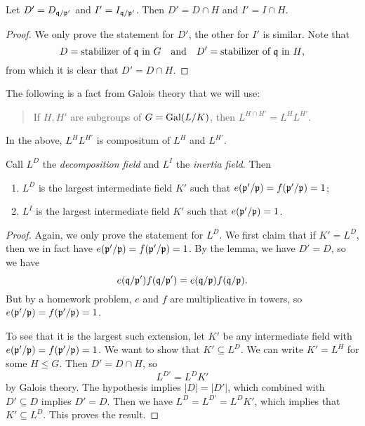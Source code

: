\begin{lemma}
  Let $D' = D_{\mathfrak{q} / \mathfrak{p}'}$ and
  $I' = I_{\mathfrak{q} / \mathfrak{p}'}$.
  Then $D' = D \cap H$ and $I' = I \cap H$.
\end{lemma}

\begin{proof}
  We only prove the statement for $D'$, the other for
  $I'$ is similar. Note that
  \[
    D = \text{stabilizer of $\mathfrak{q}$ in $G$} \quad \text{and} \quad
    D' = \text{stabilizer of $\mathfrak{q}$ in $H$},
  \]
  from which it is clear that $D' = D \cap H$.
\end{proof}

\begin{remark}
  The following is a fact from Galois theory that
  we will use:
  \begin{quote}
    If $H, H'$ are subgroups of $G = \operatorname{Gal}(L / K)$,
    then $L^{H \cap H'} = L^H L^{H'}$.
  \end{quote}
  In the above, $L^H L^{H'}$ is compositum of
  $L^H$ and $L^{H'}$.
\end{remark}

\begin{prop}
  Call $L^D$ the \emph{decomposition field} and
  $L^I$ the \emph{inertia field}. Then
  \begin{enumerate}
    \item $L^D$ is the largest intermediate field $K'$
      such that $e(\mathfrak{p}' / \mathfrak{p}) = f(\mathfrak{p}' / \mathfrak{p}) = 1$;
    \item $L^I$ is the largest intermediate field $K'$
      such that $e(\mathfrak{p}' / \mathfrak{p}) = 1$.
  \end{enumerate}
\end{prop}

\begin{proof}
  Again, we only prove the statement for $L^D$.
  We first claim that if $K' = L^D$, then we in fact
  have
  $e(\mathfrak{p}' / \mathfrak{p}) = f(\mathfrak{p}' / \mathfrak{p}) = 1$. By the lemma,
  we have $D' = D$, so we have
  \[
    e(\mathfrak{q} / \mathfrak{p}') f(\mathfrak{q} / \mathfrak{p}')
    = e(\mathfrak{q} / \mathfrak{p}) f(\mathfrak{q} / \mathfrak{p}).
  \]
  But by a homework problem, $e$ and $f$ are
  multiplicative in towers, so
  $e(\mathfrak{p}' / \mathfrak{p}) = f(\mathfrak{p}' / \mathfrak{p}) = 1$.

  To see that it is the largest such extension, let
  $K'$ be any intermediate field with
  $e(\mathfrak{p}' / \mathfrak{p}) = f(\mathfrak{p}' / \mathfrak{p}) = 1$. We want to show
  that $K' \subseteq L^D$. We can write $K' = L^H$
  for some $H \le G$. Then $D' = D \cap H$, so
  \[
    L^{D'} = L^D K'
  \]
  by Galois theory. The hypothesis implies $|D| = |D'|$,
  which combined with $D' \subseteq D$ implies
  $D' = D$. Then we have
  $L^D = L^{D'} = L^D K'$, which implies that
  $K' \subseteq L^D$.
  This proves the result.
\end{proof}

